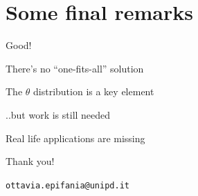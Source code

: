 \documentclass{beamer} %
\begin{document}
\section[Final remarks]{Some final remarks}

\begin{frame}


\begin{exampleblock}{Good!}
	
	There's no ``one-fits-all'' solution
	
		\vspace{2mm}
		
		 The $\theta$ distribution is a key element
\end{exampleblock}

\pause
\begin{alertblock}{..but work is still needed}
		
		Real life applications are missing
\end{alertblock}

\end{frame}

\begin{frame}[plain]
	\vspace{2cm}
	\begin{center}
		\large{Thank you!}
		
		\vspace{3mm}
		\texttt{ottavia.epifania@unipd.it}
	\end{center}
\end{frame}
\end{document}
